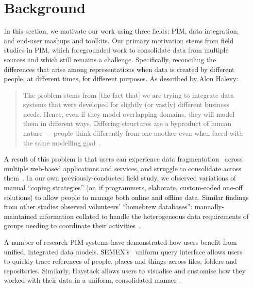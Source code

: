 \documentclass{sigchi}
\begin{document}
\section{Background}

In this section, we motivate our work using three fields: PIM, data integration, and end-user mashups and toolkits.  Our primary motivation stems from field studies in PIM, which foregrounded work to consolidate data from multiple sources and which still remains a challenge.  Specifically, reconciling the differences that arise among representations when data is created by different people, at different times, for different purposes. As described by Alon Halevy:

\begin{quote} 
The problem stems from [the fact that] we are trying to integrate data systems that were developed for slightly (or vastly) different business needs. Hence, even if they model overlapping domains, they will model them in different ways. Differing structures are a byproduct of human nature --- people think differently from one another even when faced with the same modelling goal~\cite{halevy2006data}.
\end{quote}

A result of this problem is that users can experience data fragmentation~\cite{Jones05towardsa} across multiple web-based applications and services, and struggle to consolidate across them~\cite{bergman,boardmansasse}.  In our own previously-conducted field study, \cite{infoscraps} we observed variations of manual ``coping strategies'' (or, if programmers, elaborate, custom-coded one-off solutions) to allow people to manage both online and offline data.  Similar findings from other studies observed volunteers' ``homebrew databases'': manually-maintained information collated to handle the heterogeneous data requirements of groups needing to coordinate their activities~\cite{Voida:2011:HDC:1978942.1979078}.

A number of research PIM systems have demonstrated how users benefit from unified, integrated data models.  SEMEX's~\cite{semex} uniform query interface allows users to quickly trace references of people, places and things across files, folders and repositories.  Similarly, Haystack  allows users to visualise and customise how they worked with their data in a uniform, consolidated manner \cite{haystack}. 
\end{document}
